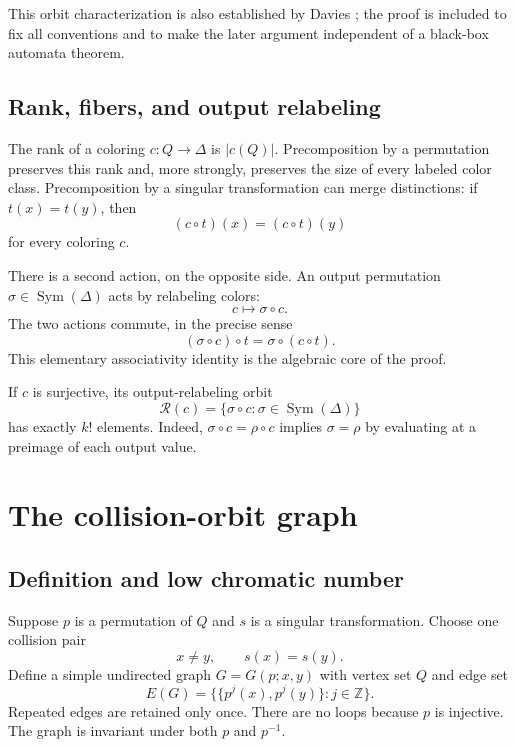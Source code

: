 \documentclass[11pt,a4paper]{article}
\numberwithin{equation}{section}
\theoremstyle{definition}
\theoremstyle{remark}
\newcommand{\Z}{\mathbb Z}
\newcommand{\D}{\Delta}
\newcommand{\Sym}{\operatorname{Sym}}
\begin{document}
This orbit characterization is also established by Davies
\cite[Proposition~4]{Davies2017}; the proof is included to fix all conventions
and to make the later argument independent of a black-box automata theorem.

\subsection{Rank, fibers, and output relabeling}

The rank of a coloring $c:Q\to\D$ is $|c(Q)|$. Precomposition by a
permutation preserves this rank and, more strongly, preserves the size of
every labeled color class. Precomposition by a singular transformation can
merge distinctions: if $t(x)=t(y)$, then
\[
 (c\circ t)(x)=(c\circ t)(y)
\]
for every coloring $c$.

There is a second action, on the opposite side. An output permutation
$\sigma\in\Sym(\D)$ acts by relabeling colors:
\[
 c\longmapsto\sigma\circ c.
\]
The two actions commute, in the precise sense
\begin{equation}\label{eq:commuteactions}
 (\sigma\circ c)\circ t=\sigma\circ(c\circ t).
\end{equation}
This elementary associativity identity is the algebraic core of the proof.

If $c$ is surjective, its output-relabeling orbit
\[
 \mathcal R(c)=\{\sigma\circ c:\sigma\in\Sym(\D)\}
\]
has exactly $k!$ elements. Indeed, $\sigma\circ c=\rho\circ c$ implies
$\sigma=\rho$ by evaluating at a preimage of each output value.

\section{The collision-orbit graph}\label{sec:graph}

\subsection{Definition and low chromatic number}

Suppose $p$ is a permutation of $Q$ and $s$ is a singular transformation.
Choose one collision pair
\[
 x\ne y,\qquad s(x)=s(y).
\]
Define a simple undirected graph $G=G(p;x,y)$ with vertex set $Q$ and edge set
\begin{equation}\label{eq:orbitgraph}
 E(G)=\bigl\{\{p^j(x),p^j(y)\}:j\in\Z\bigr\}.
\end{equation}
Repeated edges are retained only once. There are no loops because $p$ is
injective. The graph is invariant under both $p$ and $p^{-1}$.
\end{document}
